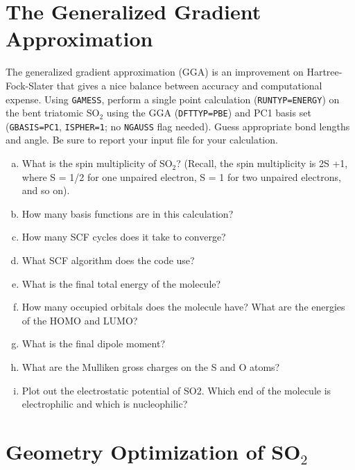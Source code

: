 \documentclass[11pt]{article}
\begin{document}
\section{The Generalized Gradient Approximation}
\label{sec-2}

The generalized gradient approximation (GGA) is an improvement on Hartree-Fock-Slater that gives a nice balance between accuracy and computational expense. Using \texttt{GAMESS}, perform a single point calculation (\verb~RUNTYP=ENERGY~) on the bent triatomic SO$_{\text{2}}$ using the GGA (\verb~DFTTYP=PBE~) and PC1 basis set (\verb~GBASIS=PC1~, \verb~ISPHER=1~; no \verb~NGAUSS~ flag needed). Guess appropriate bond lengths and angle. Be sure to report your input file for your calculation.

\begin{enumerate}[(a)]
\item What is the spin multiplicity of SO$_{\text{2}}$? (Recall, the spin multiplicity is 2S +1, where S = 1/2 for one unpaired electron, S = 1 for two unpaired electrons, and so on).

\item How many basis functions are in this calculation?

\item How many SCF cycles does it take to converge?

\item What SCF algorithm does the code use?

\item What is the final total energy of the molecule?

\item How many occupied orbitals does the molecule have? What are the energies of the HOMO and LUMO?

\item What is the final dipole moment?

\item What are the Mulliken gross charges on the S and O atoms?

\item Plot out the electrostatic potential of SO2. Which end of the molecule is electrophilic and which is nucleophilic?
\end{enumerate}

\section{Geometry Optimization of SO$_{\text{2}}$}
\label{sec-3}
\end{document}
